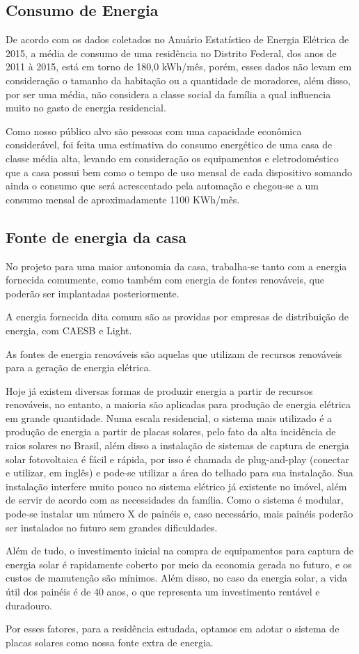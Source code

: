 \subsection{Consumo de Energia}
\par De acordo com os dados coletados no Anuário Estatístico de Energia Elétrica de 2015, a média de consumo de uma residência no Distrito Federal, dos anos de 2011 à 2015, está em torno de 180,0 kWh/mês, porém, esses dados não levam em consideração o tamanho da habitação ou a quantidade de moradores, além disso, por ser uma média, não considera a classe social da família a qual influencia muito no gasto de energia residencial.
\par Como nosso público alvo são pessoas com uma capacidade econômica considerável, foi feita uma estimativa do consumo energético de uma casa de classe média alta, levando em consideração os equipamentos e eletrodoméstico que a casa possui bem como o tempo de uso mensal de cada dispositivo somando ainda o consumo que será acrescentado pela automação e chegou-se a um consumo mensal de aproximadamente 1100 KWh/mês.

\subsection{Fonte de energia da casa}
\par No projeto para uma maior autonomia da casa, trabalha-se tanto com a energia fornecida comumente, como também com energia de fontes renováveis, que poderão ser implantadas posteriormente.
\par A energia fornecida dita comum são as providas por empresas de distribuição de energia, com CAESB e Light.
\par As fontes de energia renováveis são aquelas que utilizam de recursos renováveis para a geração de energia elétrica.
\par Hoje já existem diversas formas de produzir energia a partir de recursos renováveis, no entanto, a maioria são aplicadas para produção de energia elétrica em grande quantidade. Numa escala residencial, o sistema mais utilizado é a produção de energia a partir de placas solares, pelo fato da alta incidência de raios solares no Brasil, além disso a instalação de sistemas de captura de energia solar fotovoltaica é fácil e rápida, por isso é chamada de plug-and-play (conectar e utilizar, em inglês) e pode-se utilizar a área do telhado para sua instalação. Sua instalação interfere muito pouco no sistema elétrico já existente no imóvel, além de servir de acordo com as necessidades da família. Como o sistema é modular, pode-se instalar um número X de painéis e, caso necessário, mais painéis poderão ser instalados no futuro sem grandes dificuldades.
\par Além de tudo, o investimento inicial na compra de equipamentos para captura de energia solar é rapidamente coberto por meio da economia gerada no futuro, e os custos de manutenção são mínimos. Além disso, no caso da energia solar, a vida útil dos painéis é de 40 anos, o que representa um investimento rentável e duradouro.
\par Por esses fatores, para a residência estudada, optamos em adotar o sistema de placas solares como nossa fonte extra de energia.

